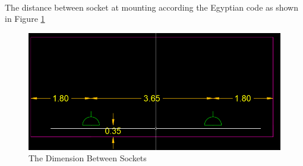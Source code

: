 \documentclass[12pt,fleqn]{book} %
\begin{document}
\\The distance  between socket at mounting according the Egyptian code  as shown in  Figure \ref{fig:s 9}
\begin{figure}[h!]
    \centering
    \includegraphics[width=1\linewidth]{s 9.png}
    \caption{ The Dimension Between Sockets }
    \label{fig:s 9}
\end{figure}
\newpage
\end{document}
